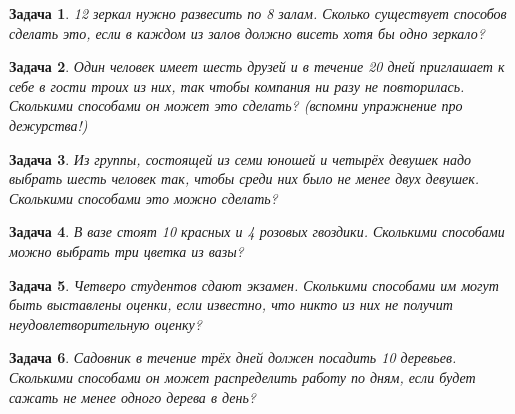 \documentclass[12pt, a4paper]{article}
\newtheorem{problem}{Задача}
\begin{document}
\begin{problem}
12 зеркал нужно развесить по 8 залам. Сколько существует способов сделать это, если в каждом из залов должно висеть хотя бы одно зеркало? 
\begin{sol}

\end{sol}
\end{problem}



\begin{problem}
Один человек имеет шесть друзей и в течение 20 дней приглашает к себе в гости троих из них, так чтобы компания ни разу не повторилась. Сколькими способами он может это сделать? (вспомни упражнение про дежурства!)
\begin{sol}

\end{sol}
\end{problem}



\begin{problem}
Из группы, состоящей из семи юношей и четырёх девушек надо выбрать шесть человек так, чтобы среди них было не менее двух девушек. Сколькими способами это можно сделать? 
\begin{sol}

\end{sol}
\end{problem}



\begin{problem}
В вазе стоят 10 красных и 4 розовых гвоздики. Сколькими способами можно выбрать три цветка из вазы?
\begin{sol}

\end{sol}
\end{problem}



\begin{problem}
Четверо студентов сдают экзамен. Сколькими способами им могут быть выставлены оценки, если известно, что никто из них не получит неудовлетворительную оценку? 
\begin{sol}

\end{sol}
\end{problem}



\begin{problem}
Садовник в течение трёх дней должен посадить 10 деревьев. Сколькими способами он может распределить работу по дням, если будет сажать не менее одного дерева в день? 
\begin{sol}

\end{sol}
\end{problem}
\end{document}
